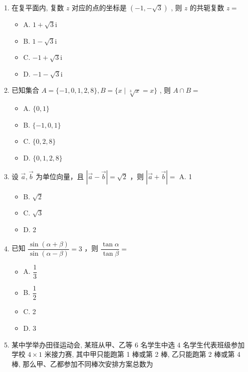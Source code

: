 \documentclass[UTF8,12pt,a4paper]{ctexart}
\renewcommand{\labelenumi}{\arabic{enumi}.}
\providecommand{\tightlist}{%
  \setlength{\itemsep}{0pt}\setlength{\parskip}{0pt}}
\begin{document}
\begin{enumerate}
\def\labelenumi{\arabic{enumi}.}
\item
  在复平面内, 复数 \(z\) 对应的点的坐标是 \((-1, -\sqrt{3})\) , 则 \(z\) 的共轭复数 \(z =\)

  \begin{itemize}
  \tightlist
  \item
    A. \(1 + \sqrt{3}\mathrm{i}\)
  \item
    B. \(1 - \sqrt{3}\mathrm{i}\)
  \item
    C. \(-1 + \sqrt{3}\mathrm{i}\)
  \item
    D. \(-1 - \sqrt{3}\mathrm{i}\)
  \end{itemize}
\item
  已知集合 \(A = \{-1, 0, 1, 2, 8\}, B = \{x \mid \sqrt[3]{x} = x\}\) , 则 \(A \cap B =\)

  \begin{itemize}
  \tightlist
  \item
    A. \(\{0, 1\}\)
  \item
    B. \(\{-1, 0, 1\}\)
  \item
    C. \(\{0, 2, 8\}\)
  \item
    D. \(\{0, 1, 2, 8\}\)
  \end{itemize}
\item
  设 \(\vec{a}, \vec{b}\) 为单位向量，且 \(|\vec{a} - \vec{b}| = \sqrt{2}\) ，则 \(|\vec{a} + \vec{b}| =\) A. 1

  \begin{itemize}
  \tightlist
  \item
    B. \(\sqrt{2}\)
  \item
    C. \(\sqrt{3}\)
  \item
    D. 2
  \end{itemize}
\item
  已知 \(\dfrac{\sin(\alpha+\beta)}{\sin(\alpha-\beta)}=3\) ，则 \(\dfrac{\tan\alpha}{\tan\beta}=\)

  \begin{itemize}
  \tightlist
  \item
    A. \(\dfrac{1}{3}\)
  \item
    B. \(\dfrac{1}{2}\)
  \item
    C. 2
  \item
    D. 3
  \end{itemize}
\item
  某中学举办田径运动会, 某班从甲、乙等 6 名学生中选 4 名学生代表班级参加学校 \(4 \times 1\) 米接力赛, 其中甲只能跑第 1 棒或第 2 棒, 乙只能跑第 2 棒或第 4 棒, 那么甲、乙都参加不同棒次安排方案总数为


\end{enumerate}
\end{document}
